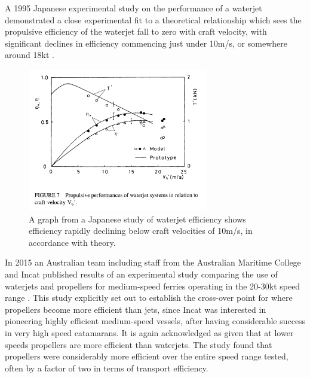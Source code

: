 \documentclass{article}\usepackage[]{graphicx}\usepackage[]{color}
\begin{document}
A 1995 Japanese experimental study on the performance of a waterjet demonstrated a close experimental fit to a theoretical relationship which sees the propulsive efficiency of the waterjet fall to zero with craft velocity, with significant declines in efficiency commencing just under 10m/s, or somewhere around 18kt \parencite{fujisawa1995}.

\begin{figure}[h]
\captionsetup{width=0.7\textwidth}
\includegraphics[width=0.7\textwidth, center]{EfficiencyJapan.png}
\caption{A graph from a Japanese study of waterjet efficiency shows efficiency rapidly declining below craft velocities of 10m/s, in accordance with theory. \parencite{fujisawa1995}}
\label{fig:EfficiencyJapan.png}
\end{figure}

In 2015 an Australian team including staff from the Australian Maritime College and Incat published results of an experimental study comparing the use of waterjets and propellers for medium-speed ferries operating in the 20-30kt speed range \parencite{kamal2015}.  This study explicitly set out to establish the cross-over point for where propellers become more efficient than jets, since Incat was interested in pioneering highly efficient medium-speed vessels, after having considerable success in very high speed catamarans.  It is again acknowledged as given that at lower speeds propellers are more efficient than waterjets.  The study found that propellers were considerably more efficient over the entire speed range tested, often by a factor of two in terms of transport efficiency.
\end{document}
